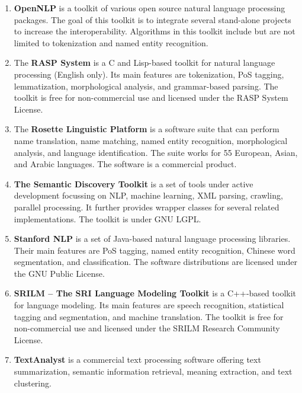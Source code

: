 \begin{enumerate}
	\item \textbf{OpenNLP} \cite{opennlp} is a toolkit of various open source natural language processing packages. The goal of this toolkit is to integrate several stand-alone projects to increase the interoperability. Algorithms in this toolkit include but are not limited to tokenization and named entity recognition.

	\item The \textbf{RASP System} \cite{briscoe2006second} is a C and Lisp-based toolkit for natural language processing (English only). Its main features are tokenization, PoS tagging, lemmatization, morphological analysis, and grammar-based parsing.
The toolkit is free for non-commercial use and licensed under the RASP System License.

	\item The \textbf{Rosette Linguistic Platform} \cite{rosette} is a software suite that can perform name translation, name matching, named entity recognition, morphological analysis, and language identification. The suite works for 55 European, Asian, and Arabic languages.
The software is a commercial product.

	\item \textbf{The Semantic Discovery Toolkit} \cite{semanticdiscovery} is a set of tools under active development focussing on NLP, machine learning, XML parsing, crawling, parallel processing. It further provides wrapper classes for several related implementations. The toolkit is under GNU LGPL.

	\item \textbf{Stanford NLP} \cite{stanfordnlp} is a set of Java-based natural language processing libraries. Their main features are PoS tagging, named entity recognition, Chinese word segmentation, and classification.
The software distributions are licensed under the GNU Public License.

	\item \textbf{SRILM -- The SRI Language Modeling Toolkit} \cite{stolcke2002srilm} is a C++-based toolkit for language modeling. Its main features are speech recognition, statistical tagging and segmentation, and machine translation.
The toolkit is free for non-commercial use and licensed under the SRILM Research Community License.

	\item \textbf{TextAnalyst} \cite{textanalyst} is a commercial text processing software offering text summarization, semantic information retrieval, meaning extraction, and text clustering.


\end{enumerate}
